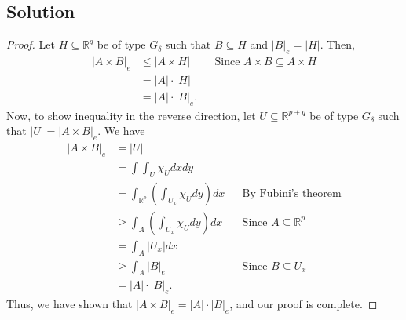 \documentclass[10pt,a4paper]{article}
\theoremstyle{theorem}
\theoremstyle{definition}
\begin{document}
\subsection*{Solution}
\begin{proof}
Let $H \subseteq \mathbb{R}^q$ be of type $G_\delta$ such that $B \subseteq H$ and $|B|_e = |H|$. Then,
\begin{align*}
|A \times B|_e &\leq |A \times H| &&\text{Since } A \times B \subseteq A \times H\\
&= |A| \cdot |H|\\
&= |A| \cdot |B|_e.
\end{align*}
Now, to show inequality in the reverse direction, let $U \subseteq \mathbb{R}^{p + q}$ be of type $G_\delta$ such that $|U| = |A \times B|_e$. We have
\begin{align*}
|A \times B|_e &= |U|\\
&= \int \int_U \chi_U dx dy\\
&= \int_{\mathbb{R}^p} \left( \int_{U_x} \chi_U dy \right) dx &&\text{By Fubini's theorem}\\
&\geq \int_{A} \left( \int_{U_x} \chi_U dy \right) dx &&\text{Since } A \subseteq \mathbb{R}^p\\
&= \int_A |U_x| dx\\
&\geq \int_A |B|_e &&\text{Since } B \subseteq U_x\\
&= |A| \cdot |B|_e.
\end{align*}
Thus, we have shown that $|A \times B|_e = |A| \cdot |B|_e$, and our proof is complete.
\end{proof}
\end{document}
